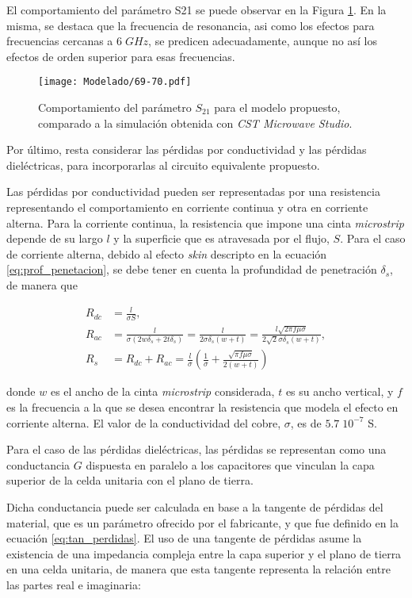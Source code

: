 El comportamiento del parámetro S21 se puede observar en la Figura \ref{fig:s21-total-sin-R}. En la misma, se destaca que la frecuencia de resonancia, asi como los efectos para frecuencias cercanas a $6\; GHz$, se predicen adecuadamente, aunque no así los efectos de orden superior para esas frecuencias.

\begin{figure}[h]
	\centering
	\texttt{[image: Modelado/69-70.pdf]}
	\caption{Comportamiento del parámetro $S_{21}$ para el modelo propuesto, comparado a la simulación obtenida con \textit{CST Microwave Studio}.}
	\label{fig:s21-total-sin-R}
\end{figure}

Por último, resta considerar las pérdidas por conductividad y las pérdidas dieléctricas, para incorporarlas al circuito equivalente propuesto.

Las pérdidas por conductividad pueden ser representadas por una resistencia representando el comportamiento en corriente continua y otra en corriente alterna. Para la corriente continua, la resistencia que impone una cinta \textit{microstrip} depende de su largo $l$ y la superficie que es atravesada por el flujo, $S$. Para el caso de corriente alterna, debido al efecto \textit{skin} descripto en la ecuación \ref{eq:prof_penetacion}, se debe tener en cuenta la profundidad de penetración $\delta_s$, de manera que

\begin{align}
R_{dc} &= \frac{l}{\sigma S}, \\
R_{ac} &= \frac{l}{\sigma(2 w \delta_s+2 t \delta_s)} = \frac{l}{2\sigma \delta_s(w +t)} = \frac{l \sqrt{2 \pi f \mu \sigma}}{2 \sqrt{2}\sigma \delta_s(w +t)}, \\
R_s &= R_{dc} + R_{ac} = \frac{l}{\sigma}  \left(\frac{1}{\sigma} + \frac{\sqrt{\pi f \mu \sigma}}{2 (w+t)}\right)
\end{align}

donde $w$ es el ancho de la cinta \textit{microstrip} considerada, $t$ es su ancho vertical, y $f$ es la frecuencia a la que se desea encontrar la resistencia que modela el efecto en corriente alterna. El valor de la conductividad del cobre, $\sigma$, es de $5.7\;10^{-7}$ S.

Para el caso de las pérdidas dieléctricas, las pérdidas se representan como una conductancia $G$ dispuesta en paralelo a los capacitores que vinculan la capa superior de la celda unitaria con el plano de tierra.

Dicha conductancia puede ser calculada en base a la tangente de pérdidas del material, que es un parámetro ofrecido por el fabricante, y que fue definido en la ecuación \ref{eq:tan_perdidas}. El uso de una tangente de pérdidas asume la existencia de una impedancia compleja entre la capa superior y el plano de tierra en una celda unitaria, de manera que esta tangente representa la relación entre las partes real e imaginaria:


